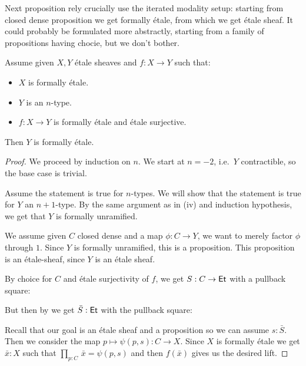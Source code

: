 Next proposition rely crucially use the iterated modality setup: starting from closed dense proposition we get formally \'etale, from which we get \'etale sheaf. It could probably be formulated more abstractly, starting from a family of propositions having chocie, but we don't bother. 

\begin{proposition}\label{formally-etale-stability-quotient}
Assume given $X,Y$ \'etale sheaves and $f:X\to Y$ such that: 
\begin{itemize}
\item $X$ is formally \'etale.
\item $Y$ is an $n$-type.
\item $f:X\to Y$ is formally \'etale and \'etale surjective.
\end{itemize}
Then $Y$ is formally \'etale.
\end{proposition}

\begin{proof}
We proceed by induction on $n$. We start at $n=-2$, i.e.\ $Y$ contractible, so the base case is trivial.

Assume the statement is true for $n$-types.
We will show that the statement is true for $Y$ an $n+1$-type. By the same argument as in  (iv) and induction hypothesis, we get that $Y$ is formally unramified.

We assume given $C$ closed dense and a map $\phi:C\to Y$, we want to merely factor $\phi$ through $1$. Since $Y$ is formally unramified, this is a proposition. This proposition is an étale-sheaf, since $Y$ is an \'etale sheaf.

By choice for $C$ and \'etale surjectivity of $f$, we get $S:C\to \mathsf{Et}$ with a pullback square:

  \begin{center}
  \end{center}

But then by  we get $\bar{S}:\mathsf{Et}$ with the pullback square:

  \begin{center}
  \end{center}

Recall that our goal is an \'etale sheaf and a proposition so we can assume $s:\bar{S}$. Then we consider the map $p\mapsto \psi(p,s):C\to X$. Since $X$ is formally \'etale we get $\bar{x}:X$ such that $\prod_{p:C}\, \bar{x} = \psi(p,s)$ and then $f(\bar{x})$ gives us the desired lift.
\end{proof}

